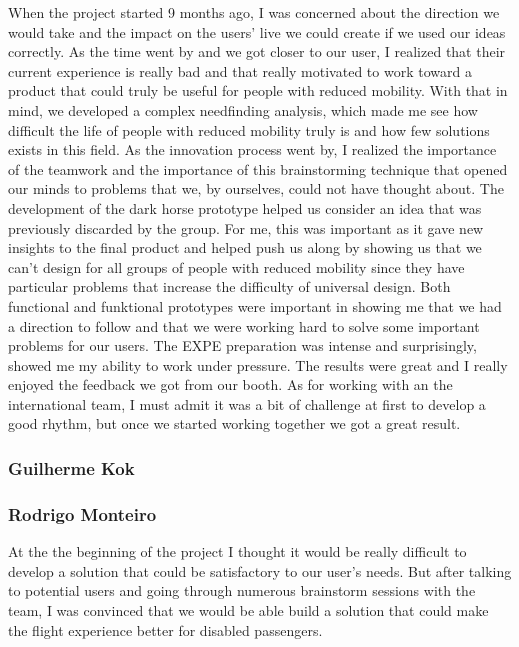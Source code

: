         	When the project started 9 months ago, I was concerned about the direction we would take and the impact on the users' live we could create if we used our ideas correctly. As the time went by and we got closer to our user, I realized that their current experience is really bad and that really motivated to work toward a product that could truly be useful for people with reduced mobility. With that in mind, we developed a complex needfinding analysis, which made me see how difficult the life of people with reduced mobility truly is and how few solutions exists in this field. As the innovation process went by, I realized the importance of the teamwork and the importance of this brainstorming technique that opened our minds to problems that we, by ourselves, could not have thought about. The development of the dark horse prototype helped us consider an idea that was previously discarded by the group. For me, this was important as it gave new insights to the final product and helped push us along by showing us that we can’t design for all groups of people with reduced mobility since they have particular problems that increase the difficulty of universal design. Both functional and funktional prototypes were important in showing me that we had a direction to follow and that we were working hard to solve some important problems for our users.  The EXPE preparation was intense and surprisingly, showed me my ability to work under pressure. The results were great and I really enjoyed the feedback we got from our booth. As for working with an the international team, I must admit it was a bit of challenge at first to develop a good rhythm, but once we started working together we got a great result.

\subsubsection{Guilherme Kok}

\subsubsection{Rodrigo Monteiro}

At the the beginning of the project I thought it would be really difficult to develop a solution that could be satisfactory to our user's needs. But after talking to potential users and  going through numerous brainstorm sessions with the team, I was convinced that we would be able build a solution that could make the flight experience better for disabled passengers.

